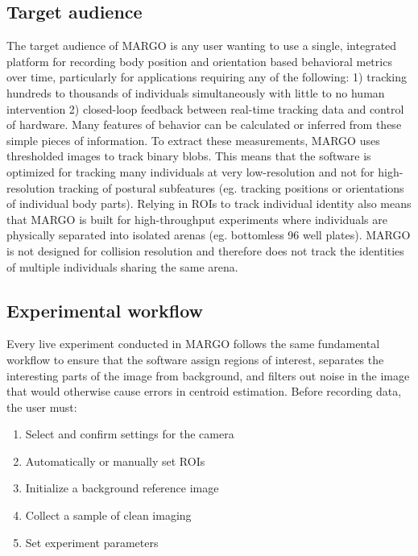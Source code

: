 \documentclass[11pt]{article}
\begin{document}
\subsection{Target audience}

The target audience of MARGO is any user wanting to use a single, integrated platform for recording body position and orientation based behavioral metrics over time, particularly for applications requiring any of the following: 1) tracking hundreds to thousands of individuals simultaneously with little to no human intervention 2) closed-loop feedback between real-time tracking data and control of hardware. Many features of behavior can be calculated or inferred from these simple pieces of information. To extract these measurements, MARGO uses thresholded images to track binary blobs. This means that the software is optimized for tracking many individuals at very low-resolution and not for high-resolution tracking of postural subfeatures (eg. tracking positions or orientations of individual body parts). Relying in ROIs to track individual identity also means that MARGO is built for high-throughput experiments where individuals are physically separated into isolated arenas (eg. bottomless 96 well plates). MARGO is not designed for collision resolution and therefore does not track the identities of multiple individuals sharing the same arena. 

\newpage
\subsection{Experimental workflow}

Every live experiment conducted in MARGO follows the same fundamental workflow to ensure that the software assign regions of interest, separates the interesting parts of the image from background, and filters out noise in the image that would otherwise cause errors in centroid estimation. Before recording data, the user must:

\begin{enumerate}
	\itemsep0em 
	\item Select and confirm settings for the camera
	\item Automatically or manually set ROIs
	\item Initialize a background reference image
	\item Collect a sample of clean imaging
	\item Set experiment parameters
\end{enumerate}
\end{document}
